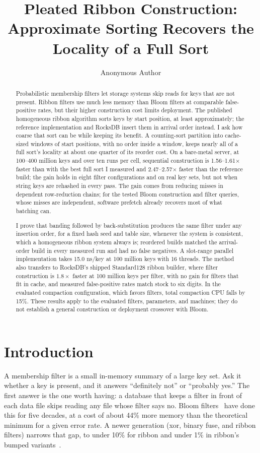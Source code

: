 \documentclass[a4paper,UKenglish,cleveref,autoref,thm-restate,anonymous]{lipics-v2021}
\title{Pleated Ribbon Construction: Approximate Sorting Recovers the Locality of a Full Sort}
\author{Anonymous Author}{Anonymous Affiliation}{}{}{}
\begin{document}
\maketitle
\begin{abstract}
Probabilistic membership filters let storage systems skip reads for keys that are not present. Ribbon filters use much less memory than Bloom filters at comparable false-positive rates, but their higher construction cost limits deployment. The published homogeneous ribbon algorithm sorts keys by start position, at least approximately; the reference implementation and RocksDB insert them in arrival order instead. I ask how coarse that sort can be while keeping its benefit. A counting-sort partition into cache-sized windows of start positions, with no order inside a window, keeps nearly all of a full sort's locality at about one quarter of its reorder cost. On a bare-metal server, at 100--400 million keys and over ten runs per cell, sequential construction is 1.56--1.61$\times$ faster than with the best full sort I measured and 2.47--2.57$\times$ faster than the reference build; the gain holds in eight filter configurations and on real key sets, but not when string keys are rehashed in every pass. The gain comes from reducing misses in dependent row-reduction chains; for the tested Bloom construction and filter queries, whose misses are independent, software prefetch already recovers most of what batching can.

I prove that banding followed by back-substitution produces the same filter under any insertion order, for a fixed hash seed and table size, whenever the system is consistent, which a homogeneous ribbon system always is; reordered builds matched the arrival-order build in every measured run and had no false negatives. A slot-range parallel implementation takes 15.0 ns/key at 100 million keys with 16 threads. The method also transfers to RocksDB's shipped Standard128 ribbon builder, where filter construction is $1.8\times$ faster at 100 million keys per filter, with no gain for filters that fit in cache, and measured false-positive rates match stock to six digits. In the evaluated compaction configuration, which favors filters, total compaction CPU falls by 15\%. These results apply to the evaluated filters, parameters, and machines; they do not establish a general construction or deployment crossover with Bloom.
\end{abstract}


\section{Introduction}
A membership filter is a small in-memory summary of a large key set. Ask it whether a key is present, and it answers ``definitely not'' or ``probably yes.'' The first answer is the one worth having: a database that keeps a filter in front of each data file skips reading any file whose filter says no. Bloom filters~\cite{bloom1970space} have done this for five decades, at a cost of about 44\% more memory than the theoretical minimum for a given error rate. A newer generation (xor, binary fuse, and ribbon filters) narrows that gap, to under 10\% for ribbon and under 1\% in ribbon's bumped variants~\cite{dillinger2021ribbon,dillinger2022burr}.
\end{document}
